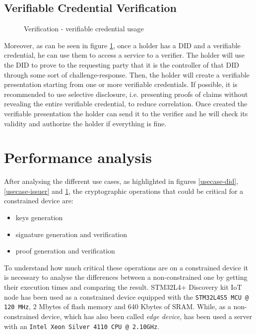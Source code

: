 \subsection{Verifiable Credential Verification}
\begin{figure}[!h]
    \centering
    
    \caption{Verification - verifiable credential usage}
    \label{usecase-verifier}
\end{figure}

Moreover, as can be seen in figure \ref{usecase-verifier}, once a holder has a DID and a verifiable credential, he can use them to access a service to a verifier. The holder will use the DID to prove to the requesting party that it is the controller of that DID through some sort of challenge-response. Then, the holder will create a verifiable presentation starting from one or more verifiable credentials. If possible, it is recommended to use selective disclosure, i.e. presenting proofs of claims without revealing the entire verifiable credential, to reduce correlation. Once created the verifiable presentation the holder can send it to the verifier and he will check its validity and authorize the holder if everything is fine.  
\section{Performance analysis}
After analysing the different use cases, as highlighted in figures \ref{usecase-did}, \ref{usecase-issuer} and \ref{usecase-verifier}, the cryptographic operations that could be  critical for a constrained device are:
\begin{itemize}
    \item keys generation
    \item signature generation and verification
    \item proof generation and verification
\end{itemize}

To understand how much critical these operations are on a constrained device it is necessary to analyse the differences between a non-constrained one by getting their execution times and comparing the result. 
STM32L4+ Discovery kit IoT node\cite{stm32-board-product} has been used as a constrained device equipped with the \texttt{STM32L4S5 MCU @ 120 MHz}, 2 Mbytes of flash memory and 640 Kbytes of SRAM. While, as a non-constrained device, which has also been called \textit{edge device}, has been used a server with an \texttt{Intel Xeon Silver 4110 CPU @ 2.10GHz}. 

